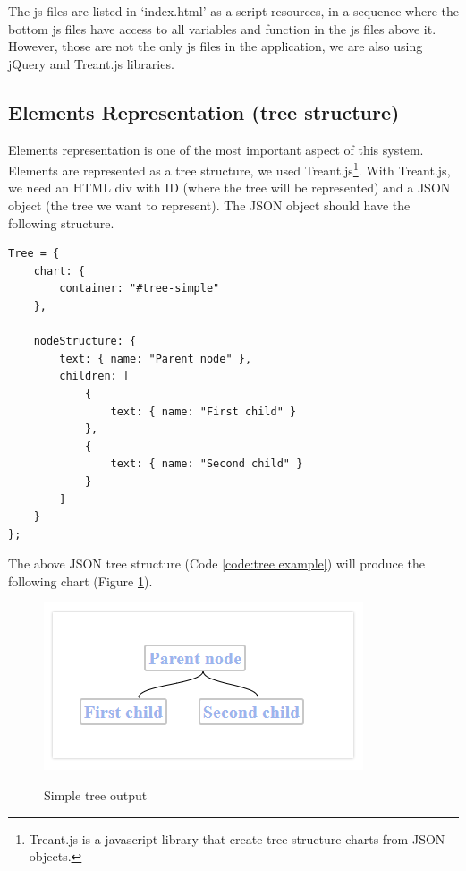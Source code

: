 \documentclass[11pt]{article} %
\begin{document}
\noindent The js files are listed in `index.html' as a script resources, in a sequence where the bottom js files have access to all variables and function in the js files above it. However, those are not the only js files in the application, we are also using jQuery and Treant.js libraries.

\subsection{Elements Representation (tree structure)}
Elements representation is one of the most important aspect of this system. Elements are represented as a tree structure, we used Treant.js\footnote{  Treant.js is a javascript library that create tree structure charts from JSON objects.}. With Treant.js, we need an HTML div with ID (where the tree will be represented) and a JSON object (the tree we want to represent). The JSON object should have the following structure.

\begin{minipage}[c]{\linewidth}
\begin{lstlisting}[basicstyle=\scriptsize, tabsize=4, frame=single, caption= Tree Example, label=code:tree example]
Tree = {
    chart: {
        container: "#tree-simple"
    },
    
    nodeStructure: {
        text: { name: "Parent node" },
        children: [
            {
                text: { name: "First child" }
            },
            {
                text: { name: "Second child" }
            }
        ]
    }
};
\end{lstlisting}
\end{minipage}
\noindent The above JSON tree structure (Code \ref{code:tree example}) will produce the following chart (Figure \ref{simple tree output}).

\begin{figure}[h!]
  \caption{Simple tree output}
  \centering
  \includegraphics{simpleTreeExample}
  \label{simple tree output}
\end{figure}
\end{document}

